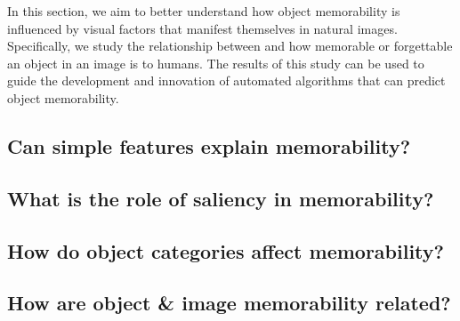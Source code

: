

In this section, we aim to better understand how object memorability is influenced by visual factors that manifest themselves in natural images. Specifically, we study the relationship between  and how memorable or forgettable an object in an image is to humans. The results of this study can be used to guide the development and innovation of automated algorithms that can predict object memorability.


\subsection{Can simple features explain memorability?}



\subsection{What is the role of saliency in memorability?}

 \label{sec:fix}

\subsection{How do object categories affect memorability?}



\subsection{How are object \& image memorability related?}


